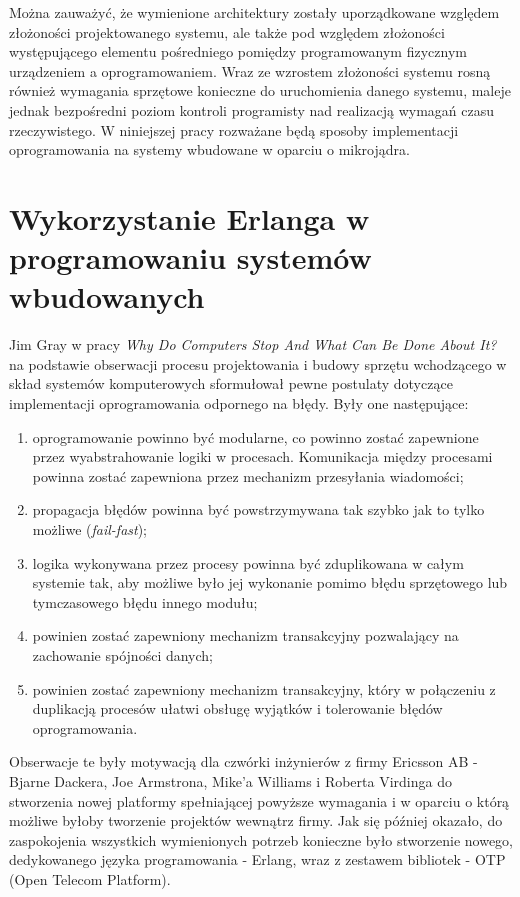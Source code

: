 Można zauważyć, że wymienione architektury zostały uporządkowane względem złożoności projektowanego systemu, ale także pod względem złożoności występującego elementu pośredniego pomiędzy programowanym fizycznym urządzeniem a oprogramowaniem. Wraz ze wzrostem złożoności systemu rosną również wymagania sprzętowe konieczne do uruchomienia danego systemu, maleje jednak bezpośredni poziom kontroli programisty nad realizacją wymagań czasu rzeczywistego.
W niniejszej pracy rozważane będą sposoby implementacji oprogramowania na systemy wbudowane w oparciu o mikrojądra.


\section{Wykorzystanie Erlanga w programowaniu systemów wbudowanych}
\label{sec:jezykiFunkcyjne}

Jim Gray w pracy \emph{Why Do Computers Stop And What Can Be Done About It?} \cite{Gray85whydo} na podstawie obserwacji procesu projektowania i budowy sprzętu wchodzącego w skład systemów komputerowych sformułował pewne postulaty dotyczące implementacji oprogramowania odpornego na błędy.
Były one następujące:
\begin{enumerate}
\item oprogramowanie powinno być modularne, co powinno zostać zapewnione przez wyabstrahowanie logiki w procesach. Komunikacja między procesami powinna zostać zapewniona przez mechanizm przesyłania wiadomości;
\item propagacja błędów powinna być powstrzymywana tak szybko jak to tylko możliwe (\emph{fail-fast});
\item logika wykonywana przez procesy powinna być zduplikowana w całym systemie tak, aby możliwe było jej wykonanie pomimo błędu sprzętowego lub tymczasowego błędu innego modułu;
\item powinien zostać zapewniony mechanizm transakcyjny pozwalający na zachowanie spójności danych;
\item powinien zostać zapewniony mechanizm transakcyjny, który w połączeniu z duplikacją procesów ułatwi obsługę wyjątków i tolerowanie błędów oprogramowania.
\end{enumerate}

Obserwacje te były motywacją dla czwórki inżynierów z firmy Ericsson AB - Bjarne Dackera, Joe Armstrona, Mike'a Williams i Roberta Virdinga do stworzenia nowej platformy spełniającej powyższe wymagania i w oparciu o którą możliwe byłoby tworzenie projektów wewnątrz firmy.
Jak się później okazało, do zaspokojenia wszystkich wymienionych potrzeb konieczne było stworzenie nowego, dedykowanego języka programowania - Erlang, wraz z zestawem bibliotek - OTP (Open Telecom Platform).

